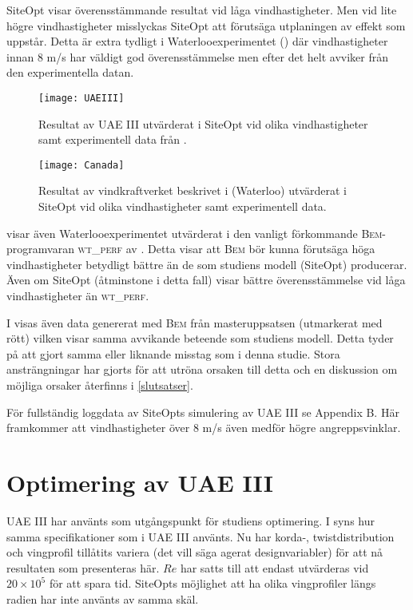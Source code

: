 SiteOpt visar överensstämmande resultat vid låga vindhastigheter. Men vid lite högre vindhastigheter misslyckas SiteOpt att förutsäga utplaningen av effekt som uppstår. Detta är extra tydligt i Waterlooexperimentet () där vindhastigheter innan 8 m/s har väldigt god överensstämmelse men efter det helt avviker från den experimentella datan.

\begin{figure}[!h]
  \centering
   \texttt{[image: UAEIII]}
  \caption{Resultat av UAE III utvärderat i SiteOpt vid olika vindhastigheter samt experimentell data från \citet{UAEIIIdata}.}
  \label{UAEIII}
\end{figure}

\begin{figure}[!h]
  \centering
  \texttt{[image: Canada]}
  \caption{Resultat av vindkraftverket beskrivet i \citet{Canada} (Waterloo) utvärderat i SiteOpt vid olika vindhastigheter samt experimentell data.}
  \label{Canada}
\end{figure}

 visar även Waterlooexperimentet utvärderat i den vanligt förkommande \textsc{Bem}-programvaran \textsc{wt\_perf} av \citet{Canada}. Detta visar att \textsc{Bem} bör kunna förutsäga höga vindhastigheter betydligt bättre än de som studiens modell (SiteOpt) producerar. Även om SiteOpt (åtminstone i detta fall) visar bättre överensstämmelse vid låga vindhastigheter än \textsc{wt\_perf}.

I  visas även data genererat med \textsc{Bem} från masteruppsatsen \citet{CST} (utmarkerat med rött) vilken visar samma avvikande beteende som studiens modell. Detta tyder på att \citet{CST} gjort samma eller liknande misstag som i denna studie. Stora ansträngningar har gjorts för att utröna orsaken till detta och en diskussion om möjliga orsaker återfinns i \ref{slutsatser}.

För fullständig loggdata av SiteOpts simulering av UAE III se Appendix B. Här framkommer att vindhastigheter över 8 m/s även medför högre angreppsvinklar.





\pagebreak
\section{Optimering av UAE III}

UAE III har använts som utgångspunkt för studiens optimering. I  syns hur samma specifikationer som i UAE III använts. Nu har korda-, twistdistribution och vingprofil tillåtits variera (det vill säga agerat designvariabler) för att nå resultaten som presenteras här. $Re$ har satts till att endast utvärderas vid $20\times10^5$ för att spara tid. SiteOpts möjlighet att ha olika vingprofiler längs radien har inte använts av samma skäl.

